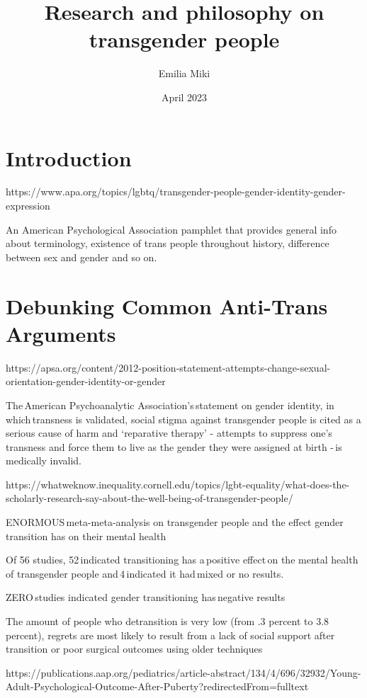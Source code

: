 \documentclass[12 pt, a4paper]{article}
\title{Research and philosophy on transgender people}
\author{Emilia Miki}
\date{April 2023}
\begin{document}
\maketitle

\section{Introduction}

https://www.apa.org/topics/lgbtq/transgender-people-gender-identity-gender-expression 

An American Psychological Association pamphlet that provides general info about terminology, existence of trans people throughout history, difference between sex and gender and so on. 

\section{Debunking Common Anti-Trans Arguments}

https://apsa.org/content/2012-position-statement-attempts-change-sexual-orientation-gender-identity-or-gender 

The American Psychoanalytic Association’s statement on gender identity, in which transness is validated, social stigma against transgender people is cited as a serious cause of harm and ‘reparative therapy’ - attempts to suppress one’s transness and force them to live as the gender they were assigned at birth - is medically invalid. 

\bigskip

https://whatweknow.inequality.cornell.edu/topics/lgbt-equality/what-does-the-scholarly-research-say-about-the-well-being-of-transgender-people/ 

ENORMOUS meta-meta-analysis on transgender people and the effect gender transition has on their mental health 

Of 56 studies, 52 indicated transitioning has a positive effect on the mental health of transgender people and 4 indicated it had mixed or no results. 

ZERO studies indicated gender transitioning has negative results 

The amount of people who detransition is very low (from .3 percent to 3.8 percent), regrets are most likely to result from a lack of social support after transition or poor surgical outcomes using older techniques 

\bigskip

https://publications.aap.org/pediatrics/article-abstract/134/4/696/32932/Young-Adult-Psychological-Outcome-After-Puberty?redirectedFrom=fulltext 
\end{document}
